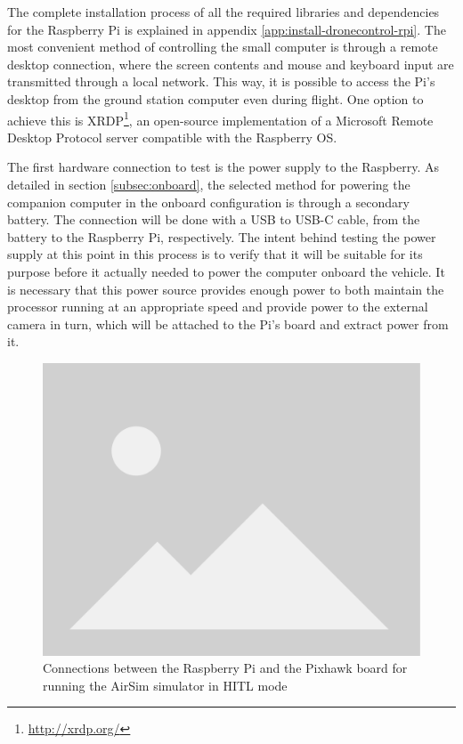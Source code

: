 
The complete installation process of all the required libraries and dependencies for the Raspberry Pi is explained in appendix \ref{app:install-dronecontrol-rpi}.
The most convenient method of controlling the small computer is through a remote desktop connection, where the screen contents and mouse and keyboard input are transmitted through a local network.
This way, it is possible to access the Pi's desktop from the ground station computer even during flight.
One option to achieve this is XRDP\footnote{\url{http://xrdp.org/}}, an open-source implementation of a Microsoft Remote Desktop Protocol server compatible with the Raspberry OS.

The first hardware connection to test is the power supply to the Raspberry.
As detailed in section \ref{subsec:onboard}, the selected method for powering the companion computer in the onboard configuration is through a secondary battery.
The connection will be done with a USB to USB-C cable, from the battery to the Raspberry Pi, respectively.
The intent behind testing the power supply at this point in this process is to verify that it will be suitable for its purpose before it actually needed to power the computer onboard the vehicle.
It is necessary that this power source provides enough power to both maintain the processor running at an appropriate speed and provide power to the external camera in turn, which will be attached to the Pi's board and extract power from it.


\begin{figure}
  \centering
  \includegraphics[width=.6\textwidth, keepaspectratio]{img/placeholder.png}
  \caption{Connections between the Raspberry Pi and the Pixhawk board for running the AirSim simulator in HITL mode}
  \label{fig:power-supply}
\end{figure}



